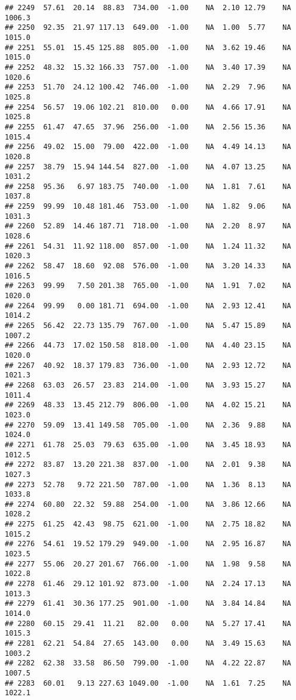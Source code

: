\documentclass{article}\usepackage{graphicx, color}
\makeatletter
\newenvironment{kframe}{%
 \def\at@end@of@kframe{}%
 \ifinner\ifhmode%
  \def\at@end@of@kframe{\end{minipage}}%
  \begin{minipage}{\columnwidth}%
 \fi\fi%
 \def\FrameCommand##1{\hskip\@totalleftmargin \hskip-\fboxsep
 \colorbox{shadecolor}{##1}\hskip-\fboxsep
     \hskip-\linewidth \hskip-\@totalleftmargin \hskip\columnwidth}%
 \MakeFramed {\advance\hsize-\width
   \@totalleftmargin\z@ \linewidth\hsize
   \@setminipage}}%
 {\par\unskip\endMakeFramed%
 \at@end@of@kframe}
\newenvironment{knitrout}{}{} %
\makeatother
\begin{document}
\begin{knitrout}
\begin{kframe}
\begin{verbatim}
## 2249  57.61  20.14  88.83  734.00  -1.00    NA  2.10 12.79    NA 1006.3
## 2250  92.35  21.97 117.13  649.00  -1.00    NA  1.00  5.77    NA 1015.0
## 2251  55.01  15.45 125.88  805.00  -1.00    NA  3.62 19.46    NA 1015.0
## 2252  48.32  15.32 166.33  757.00  -1.00    NA  3.40 17.39    NA 1020.6
## 2253  51.70  24.12 100.42  746.00  -1.00    NA  2.29  7.96    NA 1025.8
## 2254  56.57  19.06 102.21  810.00   0.00    NA  4.66 17.91    NA 1025.8
## 2255  61.47  47.65  37.96  256.00  -1.00    NA  2.56 15.36    NA 1015.4
## 2256  49.02  15.00  79.00  422.00  -1.00    NA  4.49 14.13    NA 1020.8
## 2257  38.79  15.94 144.54  827.00  -1.00    NA  4.07 13.25    NA 1031.2
## 2258  95.36   6.97 183.75  740.00  -1.00    NA  1.81  7.61    NA 1037.8
## 2259  99.99  10.48 181.46  753.00  -1.00    NA  1.82  9.06    NA 1031.3
## 2260  52.89  14.46 187.71  718.00  -1.00    NA  2.20  8.97    NA 1028.6
## 2261  54.31  11.92 118.00  857.00  -1.00    NA  1.24 11.32    NA 1020.3
## 2262  58.47  18.60  92.08  576.00  -1.00    NA  3.20 14.33    NA 1016.5
## 2263  99.99   7.50 201.38  765.00  -1.00    NA  1.91  7.02    NA 1020.0
## 2264  99.99   0.00 181.71  694.00  -1.00    NA  2.93 12.41    NA 1014.2
## 2265  56.42  22.73 135.79  767.00  -1.00    NA  5.47 15.89    NA 1007.2
## 2266  44.73  17.02 150.58  818.00  -1.00    NA  4.40 23.15    NA 1020.0
## 2267  40.92  18.37 179.83  736.00  -1.00    NA  2.93 12.72    NA 1021.3
## 2268  63.03  26.57  23.83  214.00  -1.00    NA  3.93 15.27    NA 1011.4
## 2269  48.33  13.45 212.79  806.00  -1.00    NA  4.02 15.21    NA 1023.0
## 2270  59.09  13.41 149.58  705.00  -1.00    NA  2.36  9.88    NA 1024.0
## 2271  61.78  25.03  79.63  635.00  -1.00    NA  3.45 18.93    NA 1012.5
## 2272  83.87  13.20 221.38  837.00  -1.00    NA  2.01  9.38    NA 1027.3
## 2273  52.78   9.72 221.50  787.00  -1.00    NA  1.36  8.13    NA 1033.8
## 2274  60.80  22.32  59.88  254.00  -1.00    NA  3.86 12.66    NA 1028.2
## 2275  61.25  42.43  98.75  621.00  -1.00    NA  2.75 18.82    NA 1015.2
## 2276  54.61  19.52 179.29  949.00  -1.00    NA  2.95 16.87    NA 1023.5
## 2277  55.06  20.27 201.67  766.00  -1.00    NA  1.98  9.58    NA 1022.8
## 2278  61.46  29.12 101.92  873.00  -1.00    NA  2.24 17.13    NA 1013.3
## 2279  61.41  30.36 177.25  901.00  -1.00    NA  3.84 14.84    NA 1014.0
## 2280  60.15  29.41  11.21   82.00   0.00    NA  5.27 17.41    NA 1015.3
## 2281  62.21  54.84  27.65  143.00   0.00    NA  3.49 15.63    NA 1003.2
## 2282  62.38  33.58  86.50  799.00  -1.00    NA  4.22 22.87    NA 1007.5
## 2283  60.01   9.13 227.63 1049.00  -1.00    NA  1.61  7.25    NA 1022.1

\end{verbatim}
\end{kframe}
\end{knitrout}
\end{document}
